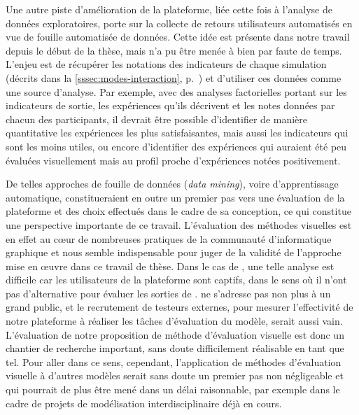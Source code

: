 Une autre piste d'amélioration de la plateforme, liée cette fois à l'analyse de données exploratoires, porte sur la collecte de retours utilisateurs automatisés en vue de fouille automatisée de données. Cette idée est présente dans notre travail depuis le début de la thèse, mais n'a pu être menée à bien par faute de temps.
L'enjeu est de récupérer les \og notations\fg{} des indicateurs de chaque simulation (décrits dans la \cref{sssec:modes-interaction}, p.~\pageref{par:noter-simul}) et d'utiliser ces données comme une source d'analyse.
Par exemple, avec des analyses factorielles portant sur les indicateurs de sortie, les expériences qu'ils décrivent et les notes données par chacun des participants, il devrait être possible d'identifier de manière quantitative les expériences les plus satisfaisantes, mais aussi les indicateurs qui sont les moins utiles, ou encore d'identifier des expériences qui auraient été peu évaluées visuellement mais au profil proche d'expériences notées positivement.

De telles approches de \og fouille de données\fg{} (\textit{data mining}), voire d'apprentissage automatique, constitueraient en outre un premier pas vers une évaluation de la plateforme \simedb{} et des choix effectués dans le cadre de sa conception, ce qui constitue une perspective importante de ce travail.
L'évaluation des méthodes visuelles est en effet au cœur de nombreuses pratiques de la communauté d'informatique graphique et nous semble indispensable pour juger de la validité de l'approche mise en œuvre dans ce travail de thèse.
Dans le cas de \simedb{}, une telle analyse est difficile car les utilisateurs de la plateforme sont captifs, dans le sens où il n'ont pas d'alternative pour évaluer les sorties de \simfeodal{}.
\simedb{} ne s'adresse pas non plus à un grand public, et le recrutement de \og testeurs\fg{} externes, pour mesurer l'effectivité de notre plateforme à réaliser les tâches d'évaluation du modèle, serait aussi vain.
L'évaluation de notre proposition de méthode d'évaluation visuelle est donc un chantier de recherche important, sans doute difficilement réalisable en tant que tel.
Pour aller dans ce sens, cependant, l'application de méthodes d'évaluation visuelle à d'autres modèles serait sans doute un premier pas non négligeable et qui pourrait de plus être mené dans un délai raisonnable, par exemple dans le cadre de projets de modélisation interdisciplinaire déjà en cours.

